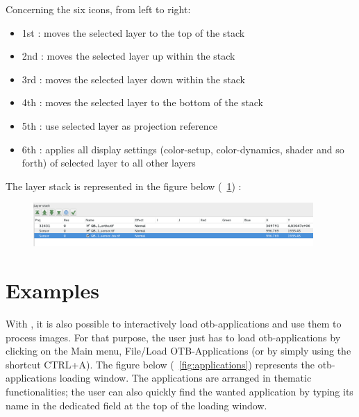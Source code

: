 Concerning the six icons, from left to right:
\begin{itemize}
\item 1st : moves the selected layer to the top of the stack
\item 2nd : moves the selected layer up within the stack
\item 3rd : moves the selected layer down within the stack
\item 4th : moves the selected layer to the bottom of the stack
\item 5th : use selected layer as projection reference
\item 6th : applies all display settings (color-setup, color-dynamics, shader and so forth) of selected layer to all other layers
\end{itemize}

The layer stack is represented in the figure below (~\ref{fig:layerstack}) :
\begin{figure}[!h] 
  \center
  \includegraphics[width=0.95\textwidth]{../Art/MonteverdiImages/layerstack.png}
  \label{fig:layerstack}
\end{figure}


\section{Examples}\label{sec:monexamples}

With \mont, it is also possible to interactively load otb-applications and use them to process images.
For that purpose, the user just has to load otb-applications by clicking on the Main menu, File/Load OTB-Applications (or by simply using the shortcut CTRL+A).
The figure below (~\ref{fig:applications}) represents the otb-applications loading window. The applications are arranged in thematic functionalities; the user can also quickly find the wanted application by typing its name in the dedicated field
at the top of the loading window.


